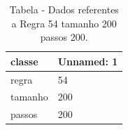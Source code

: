 \begin{table}[H]
\centering
\caption{Tabela - Dados referentes a Regra 54 tamanho 200 passos 200.}
\label{tab:regra_54_tamanho_200_passos_200}
\begin{tabular}{ll}
\toprule
classe & Unnamed: 1 \\
\midrule
regra & 54 \\
tamanho & 200 \\
passos & 200 \\
\bottomrule
\end{tabular}

\end{table}
